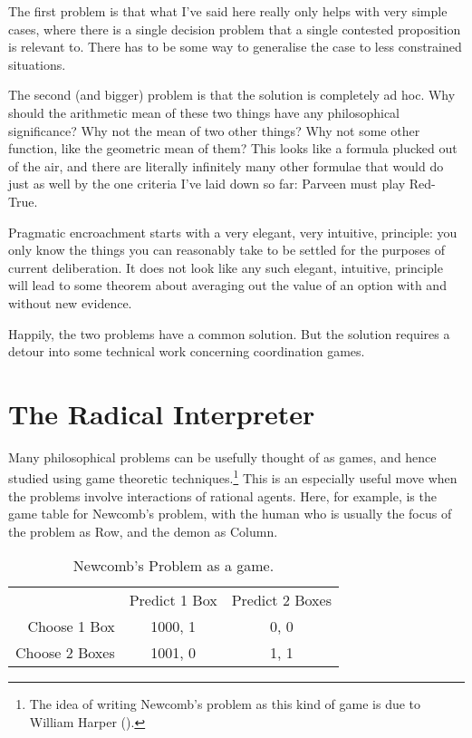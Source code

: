 \documentclass[
  12pt,
  letterpaper,
]{scrbook}
\begin{document}
The first problem is that what I've said here really only helps with
very simple cases, where there is a single decision problem that a
single contested proposition is relevant to. There has to be some way to
generalise the case to less constrained situations.

The second (and bigger) problem is that the solution is completely ad
hoc. Why should the arithmetic mean of these two things have any
philosophical significance? Why not the mean of two other things? Why
not some other function, like the geometric mean of them? This looks
like a formula plucked out of the air, and there are literally
infinitely many other formulae that would do just as well by the one
criteria I've laid down so far: Parveen must play Red-True.

Pragmatic encroachment starts with a very elegant, very intuitive,
principle: you only know the things you can reasonably take to be
settled for the purposes of current deliberation. It does not look like
any such elegant, intuitive, principle will lead to some theorem about
averaging out the value of an option with and without new evidence.

Happily, the two problems have a common solution. But the solution
requires a detour into some technical work concerning coordination
games.

\section{The Radical Interpreter}\label{sec-radicalinterpretation}

Many philosophical problems can be usefully thought of as games, and
hence studied using game theoretic techniques.\footnote{The idea of
  writing Newcomb's problem as this kind of game is due to William
  Harper ().} This is an especially
useful move when the problems involve interactions of rational agents.
Here, for example, is the game table for Newcomb's problem, with the
human who is usually the focus of the problem as Row, and the demon as
Column.

\begin{longtable}[]{@{}rcc@{}}
\caption{Newcomb's Problem as a game.}\label{tbl-Newcomb}\tabularnewline
\toprule\noalign{}
\endfirsthead
\endhead
\bottomrule\noalign{}
\endlastfoot
& Predict 1 Box & Predict 2 Boxes \\
Choose 1 Box & 1000, 1 & 0, 0 \\
Choose 2 Boxes & 1001, 0 & 1, 1 \\
\end{longtable}
\end{document}
